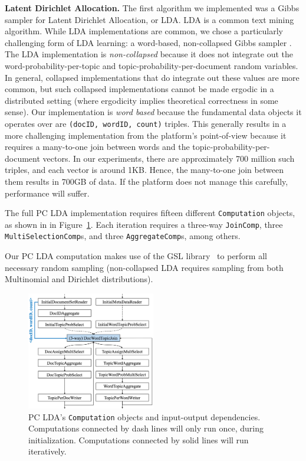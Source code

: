 \noindent
\textbf{Latent Dirichlet Allocation.}
The first algorithm we implemented was a Gibbs sampler for
Latent Dirichlet Allocation, or LDA.  LDA is a common text mining algorithm.
While LDA implementations are common, we
chose a particularly challenging form of LDA learning:
a 
word-based,
non-collapsed Gibbs sampler \cite{jermaineExperimental}.  The LDA implementation
is \emph{non-collapsed} because it does not integrate out the word-probability-per-topic
and topic-probability-per-document random variables. In general, collapsed implementations
that do integrate out these values are more common, but such collapsed implementations
cannot be made ergodic in a distributed setting
(where ergodicity implies theoretical correctness in some sense).
Our implementation is
\emph{word based} because the fundamental data objects it operates over are \texttt{(docID, wordID, count)} 
triples.  This generally results in a more challenging
implementation from the platform's point-of-view because it requires a many-to-one join between words
and the topic-probability-per-document vectors.  In our experiments, there are approximately
700 million such triples, and each vector is around 1KB.  Hence, the many-to-one join between them results in
700GB of data.  If the platform does not manage this carefully, performance will suffer.

The full PC LDA implementation requires fifteen different \texttt{Computation} objects, as shown in 
in Figure~\ref{fig:lda-query-graph}.  Each iteration requires a 
three-way \texttt{JoinComp}, three \texttt{MultiSelectionComp}s, and three
\texttt{AggregateComp}s, among others. 

Our PC LDA computation makes use of the GSL library~\cite{gsl} to perform all necessary random sampling (non-collapsed LDA requires 
sampling from both Multinomial and Dirichlet distributions).

\begin{figure}
\centering
\includegraphics[width=0.5\textwidth]{lda-query-graph.pdf}
  \caption{\label{fig:lda-query-graph} PC LDA's \texttt{Computation} objects and input-output dependencies. Computations
    connected by dash lines will only run once, during  
    initialization. Computations connected by solid lines will run iteratively.}
\end{figure}

